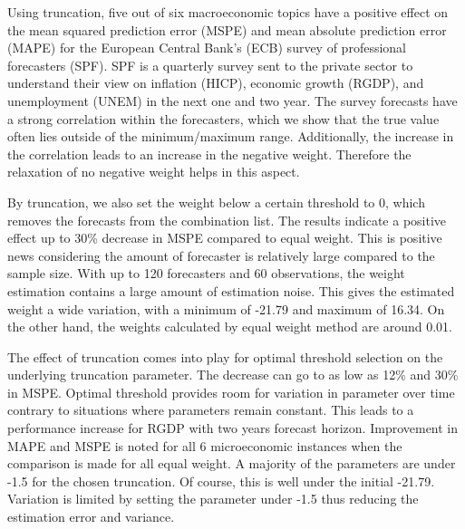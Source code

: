 \documentclass[11pt]{article}
\begin{document}
Using truncation, five out of six macroeconomic topics have a positive effect on the mean squared prediction error (MSPE) and mean absolute prediction error (MAPE) for the European Central Bank's (ECB) survey of professional forecasters (SPF). SPF is a quarterly survey sent to the private sector to understand their view on inflation (HICP), economic growth (RGDP), and unemployment (UNEM) in the next one and two year. The survey forecasts have a strong correlation within the forecasters, which we show that the true value often lies outside of the minimum/maximum range. Additionally, the increase in the correlation leads to an increase in the negative weight. Therefore the relaxation of no negative weight helps in this aspect.

By truncation, we also set the weight below a certain threshold to 0, which removes the forecasts from the combination list. The results indicate a positive effect up to 30\% decrease in MSPE compared to equal weight. This is positive news considering the amount of forecaster is relatively large compared to the sample size. With up to 120 forecasters and 60 observations, the weight estimation contains a large amount of estimation noise. This gives the estimated weight a wide variation, with a minimum of -21.79 and maximum of 16.34. On the other hand, the weights calculated by equal weight method are around 0.01.

The effect of truncation comes into play for optimal threshold selection on the underlying truncation parameter. The decrease can go to as low as 12\% and 30\% in MSPE. Optimal threshold provides room for variation in parameter over time contrary to situations where parameters remain constant. This leads to a performance increase for RGDP with two years forecast horizon. Improvement in MAPE and MSPE is noted for all 6 microeconomic instances when the comparison is made for all equal weight. A majority of the parameters are under -1.5 for the chosen truncation. Of course, this is well under the initial -21.79. Variation is limited by setting the parameter under -1.5 thus reducing the estimation error and variance. 
\end{document}
